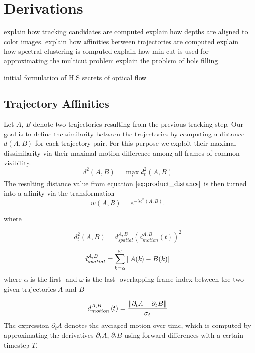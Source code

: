 \chapter{Derivations}

explain how tracking candidates are computed
explain how depths are aligned to color images.
explain how affinities between trajectories are computed
explain how spectral clustering is computed
explain how min cut is used for approximating the multicut problem
explain the problem of hole filling

initial formulation of H.S
secrets of optical flow



\section{Trajectory Affinities}
Let $A$, $B$ denote two trajectories resulting from the previous tracking step. 
Our goal is to define the similarity between the trajectories by computing a distance $d(A,B)$ for each trajectory pair. For this purpose we exploit their maximal dissimilarity via their maximal motion difference among all frames of common visibility. 
\begin{equation}
	d^2 \left( A, B \right) = \max_t d_t^2 \left( A, B \right)
	\label{eq:product_distance}
\end{equation}
The resulting distance value from equation $\ref{eq:product_distance}$ is then turned into a affinity via the transformation
\begin{equation}
	w \left( A, B \right) = e^{ -\lambda d^2 (A, B) }.
	\label{eq:prod_dist_affinity}
\end{equation}

where

\begin{equation}
	d_t^2 \left( A, B \right) = d_{spatial}^{A,B} \left( d_{motion}^{A,B} (t) \right) ^2
\end{equation}

\begin{equation}
	d_{spatial}^{A,B} = \sum_{k=\alpha}^\omega \left\lVert A(k) - B(k)\right\rVert
\end{equation}
where $\alpha$ is the first- and $\omega$ is the last- overlapping frame index between the two given trajectories $A$ and $B$.

\begin{equation}
	d_{motion}^{A,B} \left( t \right)  = \frac{\left\lVert\partial_t A - \partial_t B\right\rVert}{\sigma_t}
\end{equation}
The expression $\partial_t A$ denotes the averaged motion over time, which is computed by approximating the derivatives $\partial_t A$, $\partial_t B$ using forward differences with a certain timestep $T$.

